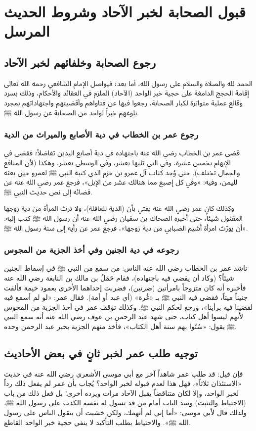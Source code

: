 \chapter{قبول الصحابة لخبر الآحاد وشروط الحديث المرسل}

\section{رجوع الصحابة وخلفائهم لخبر الآحاد}
الحمد لله والصلاة والسلام على رسول الله، أما بعد؛ فيواصل الإمام الشافعي رحمه الله تعالى إقامة الحجج الدامغة على حجية خبر الواحد (الآحاد) الملزم في العقائد والأحكام، وذلك بسرد وقائع عملية متواترة لكبار الصحابة، رجعوا فيها عن فتاواهم وأقضيتهم واجتهاداتهم بمجرد بلوغهم خبراً لواحد من الصحابة عن رسول الله ﷺ.

\subsection{رجوع عمر بن الخطاب في دية الأصابع والميراث من الدية}
قضى عمر بن الخطاب رضي الله عنه باجتهاده في دية أصابع اليدين تفاضلاً؛ فقضى في الإبهام بخمس عشرة، وفي التي تليها بعشر، وفي الوسطى بعشر، وهكذا (لأن المنافع والجمال تختلف). حتى وُجد كتاب آل عمرو بن حزم الذي كتبه النبي ﷺ لعمرو حين بعثه لليمن، وفيه: «وفي كل إصبع مما هنالك عشر من الإبل»، فرجع عمر رضي الله عنه عن قضائه إلى نص حديث النبي ﷺ. 

وكذلك كان عمر رضي الله عنه يفتي بأن (الدية للعاقلة)، ولا ترث المرأة من دية زوجها المقتول شيئاً، حتى أخبره الضحاك بن سفيان رضي الله عنه أن رسول الله ﷺ كتب إليه: «أن يورّث امرأة أشيم الضبابي من دية زوجها»، فرجع عمر عن رأيه إلى سنة رسول الله ﷺ.

\subsection{رجوعه في دية الجنين وفي أخذ الجزية من المجوس}
ناشد عمر بن الخطاب رضي الله عنه الناس: من سمع من النبي ﷺ في إسقاط الجنين شيئاً؟ (وكاد أن يقضي فيه باجتهاده)، فقام حَمَلُ بن مالك بن النابغة رضي الله عنه فأخبره أنه كان متزوجاً بامرأتين (ضرتين)، فضربت إحداهما الأخرى بعمود خيمة فألقت جنيناً ميتاً، فقضى فيه النبي ﷺ بـ «غُرة» (أي عبد أو أمة). فقال عمر: «لو لم أسمع فيه لقضينا فيه برأينا»، ورجع لحكم النبي ﷺ.
وكذلك توقف عمر في أخذ الجزية من المجوس لأنهم ليسوا أهل كتاب، حتى شهد عبد الرحمن بن عوف رضي الله عنه أنه سمع النبي ﷺ يقول: «سُنّوا بهم سنة أهل الكتاب»، فأخذ منهم الجزية بخبر عبد الرحمن وحده.

\section{توجيه طلب عمر لخبر ثانٍ في بعض الأحاديث}
فإن قيل: قد طلب عمر شاهداً آخر مع أبي موسى الأشعري رضي الله عنه في حديث «الاستئذان ثلاثاً»، فهل هذا لعدم قبوله لخبر الواحد؟ 
يُجاب بأن عمر لم يفعل ذلك رداً لخبر الواحد، وإلا لكان متناقضاً يقبل الآحاد مرات ويرده أخرى! بل فعل ذلك من باب (الاحتياط والتثبت) وسد الباب أمام من قد تسول له نفسه الكذب على رسول الله ﷺ، ولذلك قال لأبي موسى: «أما إني لم أتهمك، ولكن خشيت أن يتقول الناس على رسول الله ﷺ». والاحتياط بطلب التأكيد لا ينفي حجية خبر الواحد القاطع.


